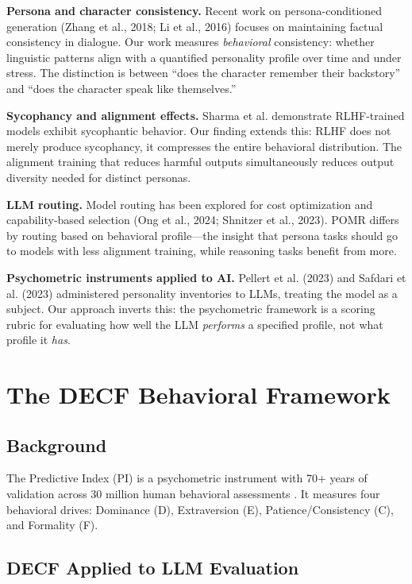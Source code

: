 \documentclass[conference]{IEEEtran}
\begin{document}
\textbf{Persona and character consistency.} Recent work on persona-conditioned generation (Zhang et al., 2018; Li et al., 2016) focuses on maintaining factual consistency in dialogue. Our work measures \textit{behavioral} consistency: whether linguistic patterns align with a quantified personality profile over time and under stress. The distinction is between ``does the character remember their backstory'' and ``does the character speak like themselves.''

\textbf{Sycophancy and alignment effects.} Sharma et al. \cite{sharma2024} demonstrate RLHF-trained models exhibit sycophantic behavior. Our finding extends this: RLHF does not merely produce sycophancy, it compresses the entire behavioral distribution. The alignment training that reduces harmful outputs simultaneously reduces output diversity needed for distinct personas.

\textbf{LLM routing.} Model routing has been explored for cost optimization and capability-based selection (Ong et al., 2024; Shnitzer et al., 2023). POMR differs by routing based on behavioral profile---the insight that persona tasks should go to models with less alignment training, while reasoning tasks benefit from more.

\textbf{Psychometric instruments applied to AI.} Pellert et al. (2023) and Safdari et al. (2023) administered personality inventories to LLMs, treating the model as a subject. Our approach inverts this: the psychometric framework is a scoring rubric for evaluating how well the LLM \textit{performs} a specified profile, not what profile it \textit{has}.

\section{The DECF Behavioral Framework}

\subsection{Background}

The Predictive Index (PI) is a psychometric instrument with 70+ years of validation across 30 million human behavioral assessments \cite{pi2020}. It measures four behavioral drives: Dominance (D), Extraversion (E), Patience/Consistency (C), and Formality (F).

\subsection{DECF Applied to LLM Evaluation}
\end{document}
